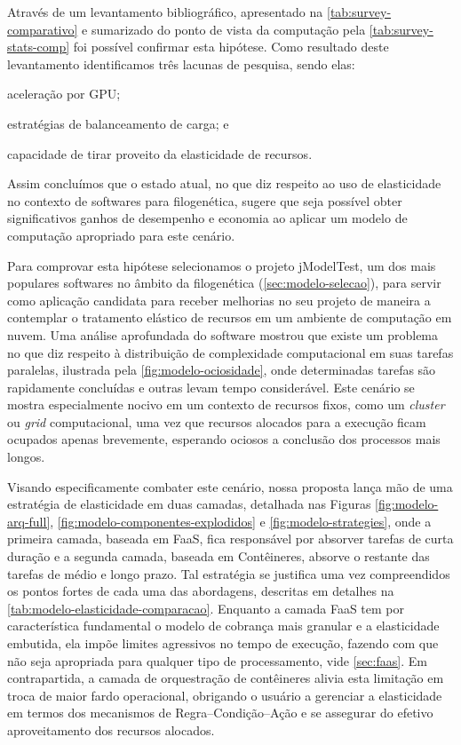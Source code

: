 \documentclass[english,brazilian]{UNISINOSmonografia} %
\begin{document}
Através de um levantamento bibliográfico, apresentado na \autoref{tab:survey-comparativo} e sumarizado do ponto de vista da computação pela \autoref{tab:survey-stats-comp} foi possível confirmar esta hipótese.
Como resultado deste levantamento identificamos três lacunas de pesquisa, sendo elas:
\begin{inparaenum}[\itshape 1\upshape)] 
	\item aceleração por GPU;
	\item estratégias de balanceamento de carga; e
	\item capacidade de tirar proveito da elasticidade de recursos.
\end{inparaenum}
Assim concluímos que o estado atual, no que diz respeito ao uso de elasticidade no contexto de softwares para filogenética, sugere que seja possível obter significativos ganhos de desempenho e economia ao aplicar um modelo de computação apropriado para este cenário.


Para comprovar esta hipótese selecionamos o projeto jModelTest, um dos mais populares softwares no âmbito da filogenética (\autoref{sec:modelo-selecao}), para servir como aplicação candidata para receber melhorias no seu projeto de maneira a contemplar o tratamento elástico de recursos em um ambiente de computação em nuvem.
Uma análise aprofundada do software mostrou que existe um problema no que diz respeito à distribuição de complexidade computacional em suas tarefas paralelas, ilustrada pela \autoref{fig:modelo-ociosidade}, onde determinadas tarefas são rapidamente concluídas e outras levam tempo considerável.
Este cenário se mostra especialmente nocivo em um contexto de recursos fixos, como um \textit{cluster} ou \textit{grid} computacional, uma vez que recursos alocados para a execução ficam ocupados apenas brevemente, esperando ociosos a conclusão dos processos mais longos.


Visando especificamente combater este cenário, nossa proposta lança mão de uma estratégia de elasticidade em duas camadas, detalhada nas Figuras \ref{fig:modelo-arq-full}, \ref{fig:modelo-componentes-explodidos} e \ref{fig:modelo-strategies}, onde a primeira camada, baseada em FaaS, fica responsável por absorver tarefas de curta duração e a segunda camada, baseada em Contêineres, absorve o restante das tarefas de médio e longo prazo.
Tal estratégia se justifica uma vez compreendidos os pontos fortes de cada uma das abordagens, descritas em detalhes na \autoref{tab:modelo-elasticidade-comparacao}.
Enquanto a camada FaaS tem por característica fundamental o modelo de cobrança mais granular e a elasticidade embutida, ela impõe limites agressivos no tempo de execução, fazendo com que não seja apropriada para qualquer tipo de processamento, vide \mbox{\autoref{sec:faas}}.
Em contrapartida, a camada de orquestração de contêineres alivia esta limitação em troca de maior fardo operacional, obrigando o usuário a gerenciar a elasticidade em termos dos mecanismos de Regra--Condição--Ação e se assegurar do efetivo aproveitamento dos recursos alocados.
\end{document}
